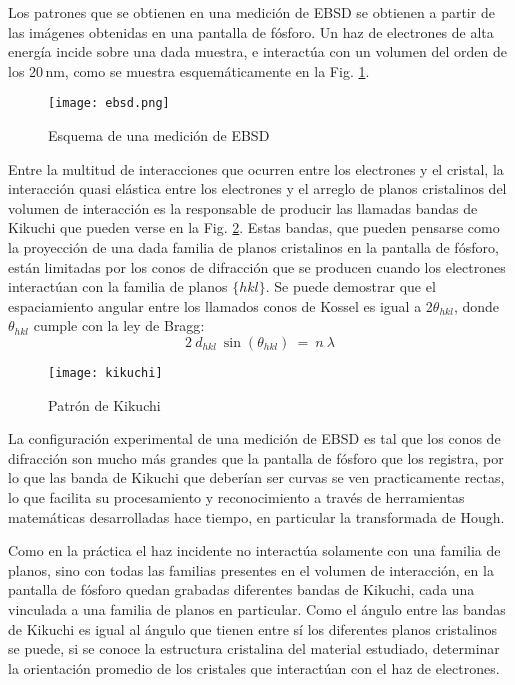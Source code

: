 Los patrones que se obtienen en una medición de EBSD se obtienen a partir de las imágenes obtenidas en una pantalla de fósforo. Un haz de electrones de alta energía incide sobre una dada muestra, e interactúa con un volumen del orden de los 20\,nm, como se muestra esquemáticamente en la Fig. \ref{fig:ebsd}.

\begin{figure}[!htb]
  \centering
  \texttt{[image: ebsd.png]}
  \caption{Esquema de una medición de EBSD}
  \label{fig:ebsd}
\end{figure}

Entre la multitud de interacciones que ocurren entre los electrones y el cristal, la interacción quasi elástica entre los electrones y el arreglo de planos cristalinos del volumen de interacción es la responsable de producir las llamadas bandas de Kikuchi que pueden verse en la Fig. \ref{fig:kikuchi}.
Estas bandas, que pueden pensarse como la proyección de una dada familia de planos cristalinos en la pantalla de fósforo, están limitadas por los conos de difracción que se producen cuando los electrones interactúan con la familia de planos $\{ hkl \}$. 
Se puede demostrar que el espaciamiento angular entre los llamados conos de Kossel es igual a 2$\theta_{hkl}$, donde $\theta_{hkl}$ cumple con la ley de Bragg\cite{schwartz2010electron}:
\begin{equation}
  2 \ d_{hkl} \ \sin(\theta_{hkl}) \ = \ n \ \lambda
  \label{eq:BraggEBSD}
\end{equation}
\noindent
\begin{figure}[!htb]
  \centering
  \texttt{[image: kikuchi]}
  \caption{Patrón de Kikuchi}
  \label{fig:kikuchi}
 \end{figure}

La configuración experimental de una medición de EBSD es tal que los conos de difracción son mucho más grandes que la pantalla de fósforo que los registra, por lo que las banda de Kikuchi que deberían ser curvas se ven practicamente rectas, lo que facilita su procesamiento y reconocimiento a través de herramientas matemáticas desarrolladas hace tiempo, en particular la transformada de Hough\cite{wiki:Hough}.

Como en la práctica el haz incidente no interactúa solamente con una familia de planos, sino con todas las familias presentes en el volumen de interacción, en la pantalla de fósforo quedan grabadas diferentes bandas de Kikuchi, cada una vinculada a una familia de planos en particular.
Como el ángulo entre las bandas de Kikuchi es igual al ángulo que tienen entre sí los diferentes planos cristalinos\cite{schwartz2010electron} se puede, si se conoce la estructura cristalina del material estudiado, determinar la orientación promedio de los cristales que interactúan con el haz de electrones.

